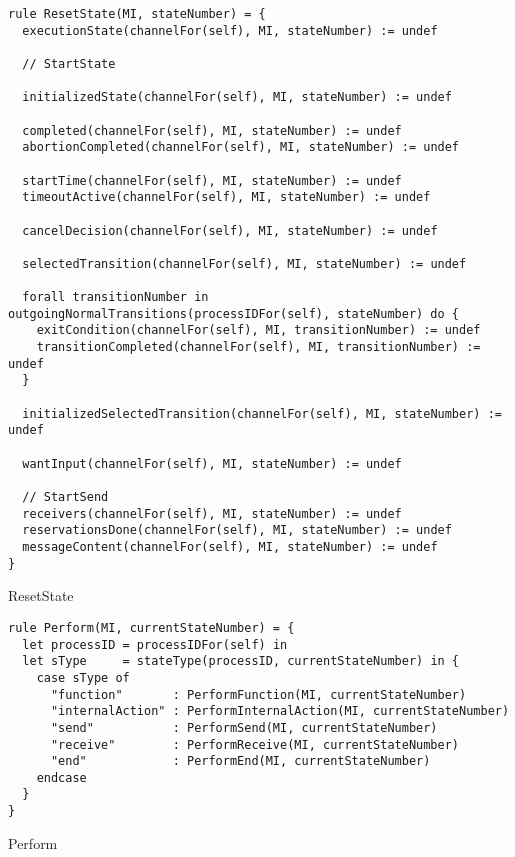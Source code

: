\begin{listing}[H]
\begin{verbatim}
rule ResetState(MI, stateNumber) = {
  executionState(channelFor(self), MI, stateNumber) := undef

  // StartState

  initializedState(channelFor(self), MI, stateNumber) := undef

  completed(channelFor(self), MI, stateNumber) := undef
  abortionCompleted(channelFor(self), MI, stateNumber) := undef

  startTime(channelFor(self), MI, stateNumber) := undef
  timeoutActive(channelFor(self), MI, stateNumber) := undef

  cancelDecision(channelFor(self), MI, stateNumber) := undef

  selectedTransition(channelFor(self), MI, stateNumber) := undef

  forall transitionNumber in outgoingNormalTransitions(processIDFor(self), stateNumber) do {
    exitCondition(channelFor(self), MI, transitionNumber) := undef
    transitionCompleted(channelFor(self), MI, transitionNumber) := undef
  }

  initializedSelectedTransition(channelFor(self), MI, stateNumber) := undef

  wantInput(channelFor(self), MI, stateNumber) := undef

  // StartSend
  receivers(channelFor(self), MI, stateNumber) := undef
  reservationsDone(channelFor(self), MI, stateNumber) := undef
  messageContent(channelFor(self), MI, stateNumber) := undef
}
\end{verbatim}
\caption{ResetState}
\label{lst:asm:ResetState}
\end{listing}




\begin{listing}[H]
\begin{verbatim}
rule Perform(MI, currentStateNumber) = {
  let processID = processIDFor(self) in
  let sType     = stateType(processID, currentStateNumber) in {
    case sType of
      "function"       : PerformFunction(MI, currentStateNumber)
      "internalAction" : PerformInternalAction(MI, currentStateNumber)
      "send"           : PerformSend(MI, currentStateNumber)
      "receive"        : PerformReceive(MI, currentStateNumber)
      "end"            : PerformEnd(MI, currentStateNumber)
    endcase
  }
}
\end{verbatim}
\caption{Perform}
\label{lst:asm:Perform}
\end{listing}





